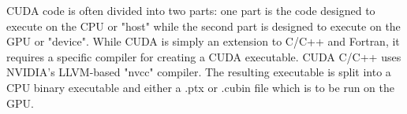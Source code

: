 CUDA code is often divided into two parts: one part is the code designed to
execute on the CPU or "host" while the second part is designed to execute on the
GPU or "device".  While CUDA is simply an extension to C/C++ and Fortran, it
requires a specific compiler for creating a CUDA executable. CUDA C/C++ uses
NVIDIA's LLVM-based "nvcc" compiler. The resulting executable is split into a
CPU binary executable and either a .ptx or .cubin file which is to be run on the
GPU.


